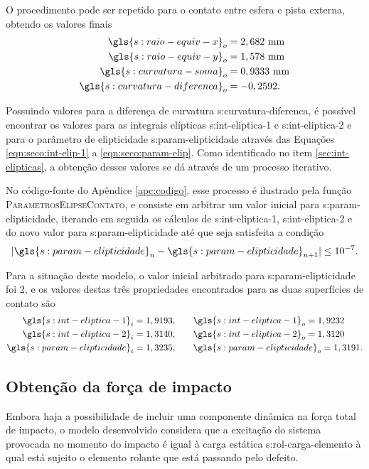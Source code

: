 \documentclass[12pt,oneside,english,brazil,lmodern,siglas,simbolos,cite=num]{ucsmonograph}
\begin{document}
	O procedimento pode ser repetido para o contato entre esfera e pista externa, obtendo os valores finais
	\begin{align*}
		\gls{s:raio-equiv-x}_o &= 2,682\ \text{mm}\\
		\gls{s:raio-equiv-y}_o &= 1,578\ \text{mm}\\
		\gls{s:curvatura-soma}_o &= 0,9333\ \text{mm}\\
		\gls{s:curvatura-diferenca}_o &= -0,2592.
	\end{align*}
	
	Possuindo valores para a diferença de curvatura \gls{s:curvatura-diferenca}, é possível encontrar os valores para as integrais elípticas \gls{s:int-eliptica-1} e \gls{s:int-eliptica-2} e para o parâmetro de elipticidade \gls{s:param-elipticidade} através das Equações \ref{eqn:seco:int-elip-1} a \ref{eqn:seco:param-elip}.
	Como identificado no item \ref{sec:int-elipticas}, a obtenção desses valores se dá através de um processo iterativo.
	
	No código-fonte do Apêndice \ref{apc:codigo}, esse processo é ilustrado pela função \textsc{ParametrosElipseContato}, e consiste em arbitrar um valor inicial para \gls{s:param-elipticidade}, iterando em seguida os cálculos de \gls{s:int-eliptica-1}, \gls{s:int-eliptica-2} e do novo valor para \gls{s:param-elipticidade} até que seja satisfeita a condição
	\begin{equation} \label{eqn:mdl:cond-parada-k}
		|\gls{s:param-elipticidade}_n - \gls{s:param-elipticidade}_{n+1}| \leq 10^{-7}.
	\end{equation}
	
	Para a situação deste modelo, o valor inicial arbitrado para \gls{s:param-elipticidade} foi $2$, e os valores destas três propriedades encontrados para as duas superfícies de contato são
	\begin{align*}
		\gls{s:int-eliptica-1}_i = 1,9193, &\qquad
		\gls{s:int-eliptica-1}_o = 1,9232 \\
		\gls{s:int-eliptica-2}_i = 1,3140, &\qquad
		\gls{s:int-eliptica-2}_o = 1,3120 \\
		\gls{s:param-elipticidade}_i = 1,3235, &\qquad
		\gls{s:param-elipticidade}_o = 1,3191.
	\end{align*}
	
	\subsection{Obtenção da força de impacto} \label{sec:mdl:forca-impacto}
	Embora haja a possibilidade de incluir uma componente dinâmica na força total de impacto, o modelo desenvolvido considera que a excitação do sistema provocada no momento do impacto é igual à carga estática \gls{s:rol-carga-elemento} à qual está sujeito o elemento rolante que está passando pelo defeito.
	
\end{document}
